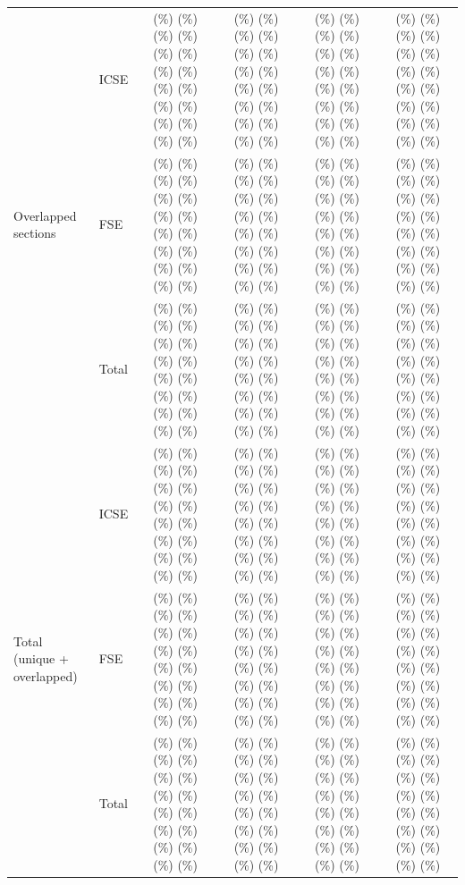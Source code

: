 \documentclass{article}
\newcommand*\ChartWithAbsoluteAndPercentageNumbersD[2]{
    \numprint{#1}&\ShowPercentageNoHundred{#1}{#2}}
\newcommand{\ShowPercentageNoHundred}[2]{%
    \FPeval\percentage{round(#1/#2*100,1)}%
    \FPeval\percentageRounded{round(#1/#2*100,0)}%
    \ifthenelse
        {\equal{\percentageRounded}{0}}%
        {(\hspace*{4.3pt}\FPprint{percentage}\%)}%
        {%
        \ifthenelse
            {\equal{\percentageRounded}{1}}%
            {(\hspace*{4.3pt}\FPprint{percentage}\%)}%
            {%
            \ifthenelse
                {\equal{\percentageRounded}{2}}%
                {(\hspace*{4.3pt}\FPprint{percentage}\%)}%
                {%
                \ifthenelse
                    {\equal{\percentageRounded}{3}}%
                    {(\hspace*{4.3pt}\FPprint{percentage}\%)}%
                    {%
                    \ifthenelse
                        {\equal{\percentageRounded}{4}}%
                        {(\hspace*{4.3pt}\FPprint{percentage}\%)}%
                        {%
                        \ifthenelse
                            {\equal{\percentageRounded}{5}}%
                            {(\hspace*{4.3pt}\FPprint{percentage}\%)}%
                            {%
                            \ifthenelse
                                {\equal{\percentageRounded}{6}}%
                                {(\hspace*{4.3pt}\FPprint{percentage}\%)}%
                                {%
                                \ifthenelse
                                    {\equal{\percentageRounded}{7}}%
                                    {(\hspace*{4.3pt}\FPprint{percentage}\%)}%
                                    {%
                                    \ifthenelse
                                        {\equal{\percentageRounded}{8}}%
                                        {(\hspace*{4.3pt}\FPprint{percentage}\%)}%
                                        {%
                                        \ifthenelse
                                            {\equal{\percentageRounded}{9}}%
                                            {(\hspace*{4.3pt}\FPprint{percentage}\%)}%
                                            {%
                                            \ifthenelse
                                                {\equal{\percentage}{9.5}}%
                                                {(\hspace*{4.3pt}\FPprint{percentage}\%)}%
                                                {%
                                                \ifthenelse
                                                    {\equal{\percentage}{9.6}}%
                                                    {(\hspace*{4.3pt}\FPprint{percentage}\%)}%
                                                    {%
                                                    \ifthenelse
                                                        {\equal{\percentage}{9.7}}%
                                                        {(\hspace*{4.3pt}\FPprint{percentage}\%)}%
                                                        {%
                                                        \ifthenelse
                                                            {\equal{\percentage}{9.8}}%
                                                            {(\hspace*{4.3pt}\FPprint{percentage}\%)}%
                                                            {%
                                                            \ifthenelse
                                                                {\equal{\percentage}{9.9}}%
                                                                {(\hspace*{4.3pt}\FPprint{percentage}\%)}%
                                                                {%
                                                                    (\FPprint{percentage}\%)
                                                                }%
                                                            }%
                                                        }%
                                                    }%
                                                }%
                                            }%
                                        }%
                                    }%
                                }%
                            }%
                        }%
                    }%
                }%
            }%
        }%
}%
\begin{document}
\begin{table}[htbp]
\begin{threeparttable}
\begin{tabular}{@{}l l r @{\hskip 0.04in} l r @{\hskip 0.04in} l r @{\hskip 0.04in} l r @{\hskip 0.04in} l@{}}
\multirow{3}{*}{Overlapped sections}&
ICSE&
  \ChartWithAbsoluteAndPercentageNumbersD{\varLinkInIntroductionAndMoreICSE}{\varTotalOfPapersWithLinkICSE}&
  \ChartWithAbsoluteAndPercentageNumbersD{\varLinkInConclusionAndMoreICSE}{\varTotalOfPapersWithLinkICSE}&
  \ChartWithAbsoluteAndPercentageNumbersD{\varLinkInSpecificAndMoreICSE}{\varTotalOfPapersWithLinkICSE}&
  \ChartWithAbsoluteAndPercentageNumbersD{\varLinkInOtherPlaceAndMoreICSE}{\varTotalOfPapersWithLinkICSE}\\
&
FSE&
  \ChartWithAbsoluteAndPercentageNumbersD{\varLinkInIntroductionAndMoreFSE}{\varTotalOfPapersWithLinkFSE}&
  \ChartWithAbsoluteAndPercentageNumbersD{\varLinkInConclusionAndMoreFSE}{\varTotalOfPapersWithLinkFSE}&
  \ChartWithAbsoluteAndPercentageNumbersD{\varLinkInSpecificAndMoreFSE}{\varTotalOfPapersWithLinkFSE}&
  \ChartWithAbsoluteAndPercentageNumbersD{\varLinkInOtherPlaceAndMoreFSE}{\varTotalOfPapersWithLinkFSE}\\
  &
Total&
  \ChartWithAbsoluteAndPercentageNumbersD{\varLinkInIntroductionAndMoreICSEFSE}{\varTotalOfPapersWithLinkICSEFSE}&
  \ChartWithAbsoluteAndPercentageNumbersD{\varLinkInConclusionAndMoreICSEFSE}{\varTotalOfPapersWithLinkICSEFSE}&
  \ChartWithAbsoluteAndPercentageNumbersD{\varLinkInSpecificAndMoreICSEFSE}{\varTotalOfPapersWithLinkICSEFSE}&
  \ChartWithAbsoluteAndPercentageNumbersD{\varLinkInOtherPlaceAndMoreICSEFSE}{\varTotalOfPapersWithLinkICSEFSE}\\ 
     \midrule
\multirow{3}{*}{Total (unique + overlapped)}
&
ICSE&
  \ChartWithAbsoluteAndPercentageNumbersD{\varLinkInIntroductionICSE}{\varTotalOfPapersWithLinkICSE}&
  \ChartWithAbsoluteAndPercentageNumbersD{\varLinkInConclusionICSE}{\varTotalOfPapersWithLinkICSE}&
  \ChartWithAbsoluteAndPercentageNumbersD{\varLinkInSpecificICSE}{\varTotalOfPapersWithLinkICSE}&
  \ChartWithAbsoluteAndPercentageNumbersD{\varLinkInOtherPlaceICSE}{\varTotalOfPapersWithLinkICSE}\\
&
FSE&
  \ChartWithAbsoluteAndPercentageNumbersD{\varLinkInIntroductionFSE}{\varTotalOfPapersWithLinkFSE}&
  \ChartWithAbsoluteAndPercentageNumbersD{\varLinkInConclusionFSE}{\varTotalOfPapersWithLinkFSE}&
  \ChartWithAbsoluteAndPercentageNumbersD{\varLinkInSpecificFSE}{\varTotalOfPapersWithLinkFSE}&
  \ChartWithAbsoluteAndPercentageNumbersD{\varLinkInOtherPlaceFSE}{\varTotalOfPapersWithLinkFSE}\\
  &
Total&
  \ChartWithAbsoluteAndPercentageNumbersD{\varLinkInIntroductionICSEFSE}{\varTotalOfPapersWithLinkICSEFSE}&
  \ChartWithAbsoluteAndPercentageNumbersD{\varLinkInConclusionICSEFSE}{\varTotalOfPapersWithLinkICSEFSE}&
  \ChartWithAbsoluteAndPercentageNumbersD{\varLinkInSpecificICSEFSE}{\varTotalOfPapersWithLinkICSEFSE}&
  \ChartWithAbsoluteAndPercentageNumbersD{\varLinkInOtherPlaceICSEFSE}{\varTotalOfPapersWithLinkICSEFSE}\\ 
  \bottomrule
\end{tabular}
\end{threeparttable}
\end{table}
\end{document}

